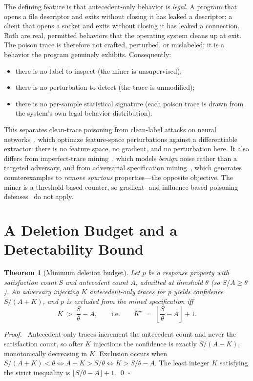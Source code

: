 \documentclass[runningheads]{llncs}
\newtheorem{thm}{Theorem}
\newenvironment{proof}{\par\noindent\textit{Proof.}\ }{\hfill$\square$\par}}{}
\begin{document}
The defining feature is that antecedent-only behavior is \emph{legal}. A program
that opens a file descriptor and exits without closing it has leaked a
descriptor; a client that opens a socket and exits without closing it has leaked
a connection. Both are real, permitted behaviors that the operating system cleans
up at exit. The poison trace is therefore not crafted, perturbed, or mislabeled;
it is a behavior the program genuinely exhibits. Consequently:
\begin{itemize}
\item there is no label to inspect (the miner is unsupervised);
\item there is no perturbation to detect (the trace is unmodified);
\item there is no per-sample statistical signature (each poison trace is drawn
from the system's own legal behavior distribution).
\end{itemize}

This separates clean-trace poisoning from clean-label attacks on neural
networks~\cite{poisonfrogs,metapoison,bullseye}, which optimize feature-space
perturbations against a differentiable extractor: there is no feature space, no
gradient, and no perturbation here. It also differs from imperfect-trace
mining~\cite{purltl}, which models \emph{benign} noise rather than a targeted
adversary, and from adversarial specification mining~\cite{adversarialsm}, which
generates counterexamples to \emph{remove spurious} properties---the opposite
objective. The miner is a threshold-based counter, so gradient- and
influence-based poisoning defenses~\cite{koh} do not apply.

\section{A Deletion Budget and a Detectability Bound}\label{sec:bound}
\begin{thm}[Minimum deletion budget]\label{thm:budget}
Let $p$ be a response property with satisfaction count $S$ and antecedent count
$A$, admitted at threshold $\theta$ (so $S/A\ge\theta$). An adversary injecting
$K$ antecedent-only traces for $p$ yields confidence $S/(A+K)$, and $p$ is
excluded from the mined specification iff
\[
K \;>\; \frac{S}{\theta}-A,\qquad\text{i.e.}\qquad
K^\star \;=\; \left\lfloor \frac{S}{\theta}-A\right\rfloor + 1 .
\]
\end{thm}
\begin{proof}
Antecedent-only traces increment the antecedent count and never the satisfaction
count, so after $K$ injections the confidence is exactly $S/(A+K)$, monotonically
decreasing in $K$. Exclusion occurs when $S/(A+K)<\theta\Leftrightarrow A+K>S/\theta
\Leftrightarrow K>S/\theta-A$. The least integer $K$ satisfying the strict
inequality is $\lfloor S/\theta-A\rfloor+1$.
\qed
\end{proof}
\end{document}
